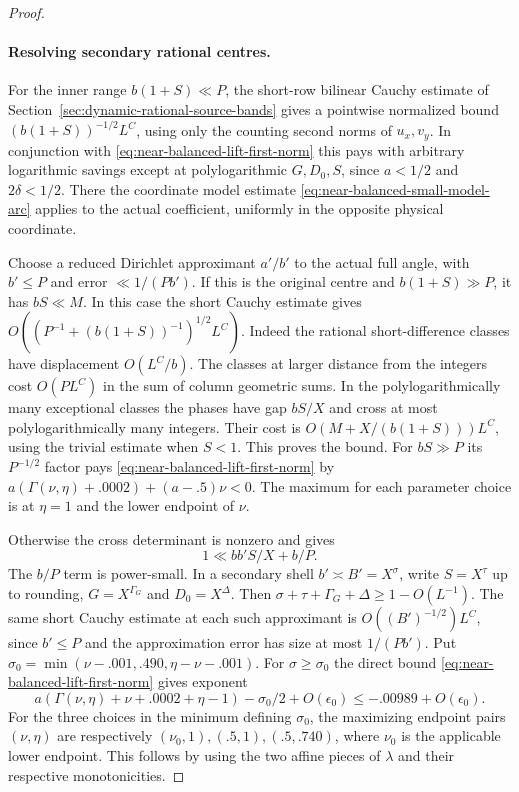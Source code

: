 \documentclass[11pt,a4paper]{article}
\theoremstyle{paperplain}
\numberwithin{equation}{section}
\begin{document}
\begin{proof}
\paragraph{Resolving secondary rational centres.}
For the inner range $b(1+S)\ll P$, the short-row bilinear
Cauchy estimate of Section~\ref{sec:dynamic-rational-source-bands}
gives a pointwise normalized bound $(b(1+S))^{-1/2}L^C$,
using only the counting second norms of $u_x,v_y$.
In conjunction with \eqref{eq:near-balanced-lift-first-norm}
this pays with arbitrary logarithmic savings except at
polylogarithmic $G,D_0,S$, since $a<1/2$ and $2\delta<1/2$.
There the coordinate model estimate
\eqref{eq:near-balanced-small-model-arc} applies to the
actual coefficient, uniformly in the opposite physical
coordinate.

Choose a reduced Dirichlet approximant $a'/b'$ to the
actual full angle, with $b'\le P$ and error
$\ll1/(Pb')$. If this is the original centre and
$b(1+S)\gg P$, it has $bS\ll M$. In this case the
short Cauchy estimate gives $O((P^{-1}+(b(1+S))^{-1})^{1/2}L^C)$.
Indeed the rational short-difference classes have displacement
$O(L^C/b)$. The classes at larger distance from the integers
cost $O(P L^C)$ in the sum of column geometric sums.
In the polylogarithmically many exceptional classes the phases have
gap $bS/X$ and cross at most polylogarithmically many integers. Their
cost is $O(M+X/(b(1+S)))L^C$, using the trivial estimate
when $S<1$. This proves the bound. For $bS\gg P$ its
$P^{-1/2}$ factor pays \eqref{eq:near-balanced-lift-first-norm}
by $a(\Gamma(\nu,\eta)+.0002)+(a-.5)\nu<0$. The maximum
for each parameter choice is at $\eta=1$ and the lower
endpoint of $\nu$.

Otherwise the cross determinant is nonzero and gives
\begin{equation}\label{eq:near-balanced-cross-determinant}
               1\ll b b' S/X + b/P.
\end{equation}
The $b/P$ term is power-small. In a secondary shell
$b'\asymp B'=X^\sigma$, write $S=X^\tau$ up to rounding,
$G=X^{\Gamma_G}$ and $D_0=X^\Delta$. Then
$\sigma+\tau+\Gamma_G+\Delta\ge1-O(L^{-1})$.
The same short Cauchy estimate at each such approximant
is $O((B')^{-1/2})L^C$, since $b'\le P$ and the
approximation error has size at most $1/(P b')$. Put
$\sigma_0=\min(\nu-.001,.490,\eta-\nu-.001)$.
For $\sigma\ge\sigma_0$ the direct bound
\eqref{eq:near-balanced-lift-first-norm} gives exponent
\[
  a(\Gamma(\nu,\eta)+\nu+.0002+\eta-1)-\sigma_0/2
     +O(\epsilon_0)\le-.00989+O(\epsilon_0).
\]
For the three choices in the minimum defining $\sigma_0$,
the maximizing endpoint pairs $(\nu,\eta)$ are respectively
$(\nu_0,1),(.5,1),(.5,.740)$, where $\nu_0$ is the applicable
lower endpoint. This follows by using the two affine pieces
of $\lambda$ and their respective monotonicities.


\end{proof}
\end{document}
